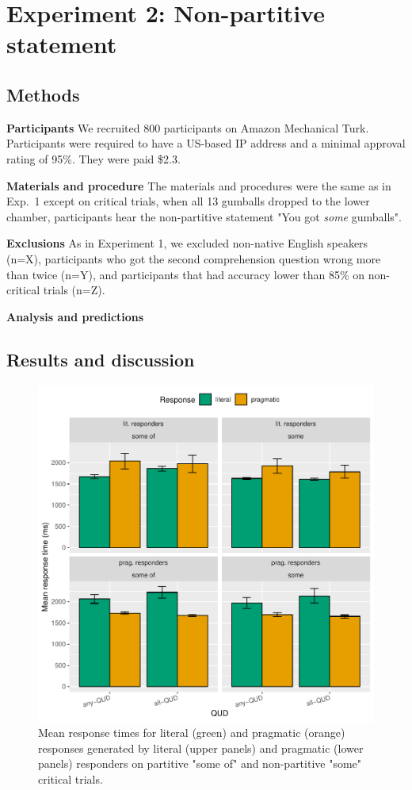 \documentclass[10pt,letterpaper]{article}
\begin{document}
\section{Experiment 2: Non-partitive statement}

\subsection{Methods}

\noindent \textbf{Participants} We recruited 800 participants on Amazon Mechanical Turk. Participants were required to have a US-based IP address and a minimal approval rating of 95\%. They were paid \$2.3.

\noindent \textbf{Materials and procedure} The materials and procedures were the same as in Exp.~1 except on critical trials, when all 13 gumballs dropped to the lower chamber, participants hear the non-partitive statement "You got \textit{some} gumballs".

\noindent \textbf{Exclusions} As in Experiment 1, we excluded non-native English speakers (n=X), participants who got the second comprehension question wrong more than twice (n=Y), and participants that had accuracy lower than 85\% on non-critical trials (n=Z).

\noindent \textbf{Analysis and predictions}

\subsection{Results and discussion}

\begin{figure}
  \includegraphics[width=\columnwidth]{plots/responsetimes.pdf}
  \caption{Mean response times for literal (green) and pragmatic (orange) responses generated by literal (upper panels) and pragmatic (lower panels) responders on partitive "some of" and non-partitive "some" critical trials. \label{fig:responsetimes}}
\end{figure}
\end{document}
